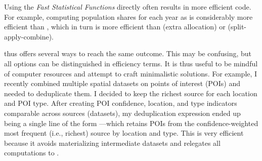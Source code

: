\documentclass[nojss]{jss} %
\newcommand{\fct}[1]{\code{#1()}}
\begin{document}
Using the \emph{Fast Statistical Functions} directly often results in more efficient code. For example, computing population shares for each year as  is considerably more efficient than , which in turn is more efficient than  (extra allocation) or  (split-apply-combine). \newline

 thus offers several ways to reach the same outcome. This may be confusing, but all options can be distinguished in efficiency terms. It is thus useful to be mindful of computer resources and attempt to craft minimalistic solutions. For example, I recently combined multiple spatial datasets on points of interest (POIs) and needed to deduplicate them. I decided to keep the richest source for each location and POI type. After creating POI confidence, location, and type indicators comparable across sources (datasets), my deduplication expression ended up being a single line of the form ---which retains POIs from the confidence-weighted most frequent (i.e., richest) source by location and type. This is very efficient because it avoids materializing intermediate datasets and relegates all computations to \fct{fmode}.
%
\end{document}
